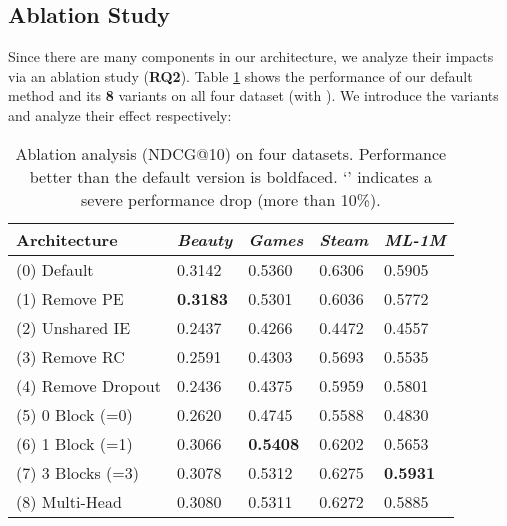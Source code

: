 \documentclass[conference]{IEEEtran}
\begin{document}
\subsection{Ablation Study}

Since there are many components in our architecture, we analyze their impacts via an ablation study (\textbf{RQ2}). Table \ref{tb:ablation} shows the performance of our default method and its \textbf{8} variants on all four dataset (with ). We introduce the variants and analyze their effect respectively:


\begin{table}[h]
\centering
\caption{Ablation analysis (NDCG@10) on four datasets. Performance better than the default version is boldfaced. `' indicates a severe performance drop (more than 10\%).}
\begin{tabular}{lllll}
\toprule
Architecture				& \emph{Beauty}		&	\emph{Games}	&	\emph{Steam}	&	\emph{ML-1M}\\ \midrule                               
(0) Default  				&	0.3142				&	0.5360					&	0.6306				&	0.5905 \\
(1) Remove PE        	 	&	\textbf{0.3183}		&	0.5301					&	0.6036				&	0.5772 \\
(2) Unshared IE				&	0.2437	&	0.4266		&	0.4472	&	0.4557 \\
(3) Remove RC        	 	&	0.2591	&	0.4303		&	0.5693	&	0.5535 \\
(4) Remove Dropout         	&	0.2436	&	0.4375		&	0.5959	&	0.5801 \\
(5) 0 Block (=0)			&	0.2620  &	0.4745		&	0.5588	&	0.4830 \\
(6) 1 Block (=1)			&	0.3066 				&	\textbf{0.5408}			&	0.6202	&	0.5653 \\
(7) 3 Blocks (=3)			&	0.3078			 	&	0.5312					&	0.6275	&	\textbf{0.5931} \\
(8) Multi-Head 			  	&	0.3080				&	0.5311					&	0.6272	&	0.5885 \\
\bottomrule
\end{tabular}
\label{tb:ablation}
\end{table}
\end{document}
